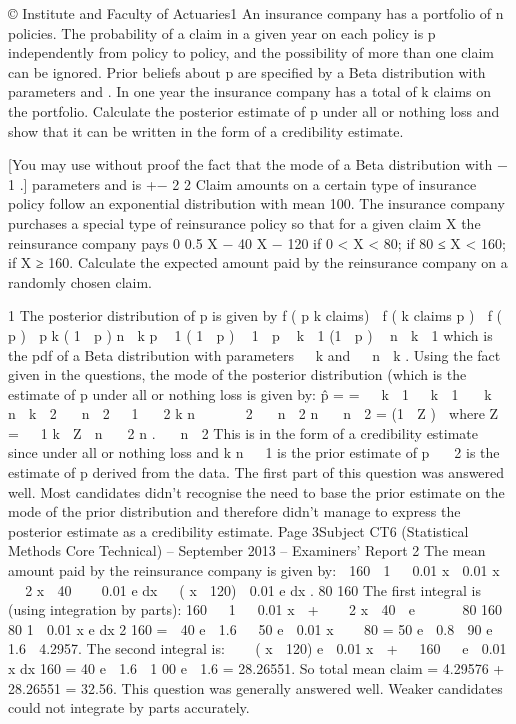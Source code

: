 

© Institute and Faculty of Actuaries1
An insurance company has a portfolio of n policies. The probability of a claim in a
given year on each policy is p independently from policy to policy, and the possibility
of more than one claim can be ignored. Prior beliefs about p are specified by a Beta
distribution with parameters \alpha and \beta. In one year the insurance company has a total
of k claims on the portfolio.
Calculate the posterior estimate of p under all or nothing loss and show that it can be
written in the form of a credibility estimate.

[You may use without proof the fact that the mode of a Beta distribution with
\alpha − 1
.]
parameters \alpha and \beta is
\alpha +\beta− 2
2
Claim amounts on a certain type of insurance policy follow an exponential
distribution with mean 100. The insurance company purchases a special type of
reinsurance policy so that for a given claim X the reinsurance company pays
0
0.5 X − 40
X − 120
if 0 < X < 80;
if 80 ≤ X < 160;
if X ≥ 160.
Calculate the expected amount paid by the reinsurance company on a randomly
chosen claim.


1
The posterior distribution of p is given by
f ( p k claims)  f ( k claims p )  f ( p )
 p k ( 1  p ) n  k p  1 ( 1  p )  1
 p  k  1 (1  p )  n  k  1
which is the pdf of a Beta distribution with parameters   k and   n  k .
Using the fact given in the questions, the mode of the posterior distribution (which is
the estimate of p under all or nothing loss is given by:
p̂ =
=
  k  1
  k  1

 k  n  k  2  n  2
  1
 2
k
n

 
 2  n  2 n  n  2
= (1  Z ) 
where Z
=
  1
k
 Z 
n
 2
n
.
 n  2
This is in the form of a credibility estimate since
under all or nothing loss and k
n
  1
is the prior estimate of p
 2
is the estimate of p derived from the data.
The first part of this question was answered well. Most candidates didn’t recognise the need
to base the prior estimate on the mode of the prior distribution and therefore didn’t manage
to express the posterior estimate as a credibility estimate.
Page 3Subject CT6 (Statistical Methods Core Technical) – September 2013 – Examiners’ Report
2
The mean amount paid by the reinsurance company is given by:

160
 1

 0.01 x
 0.01 x
   2 x  40    0.01 e dx   ( x  120)  0.01 e dx .
80
160
The first integral is (using integration by parts):
160
  1
  0.01 x 
+
   2 x  40  e


 
 80
160

80
1  0.01 x
e
dx
2
160
=  40 e  1.6   50 e  0.01 x 

 80
= 50 e  0.8  90 e  1.6  4.2957.
The second integral is:

  ( x  120) e  0.01 x 
+

 160

 e
 0.01 x
dx
160
= 40 e  1.6  1 00 e  1.6
= 28.26551.
So total mean claim = 4.29576 + 28.26551 = 32.56.
This question was generally answered well. Weaker candidates could not integrate by parts
accurately.
